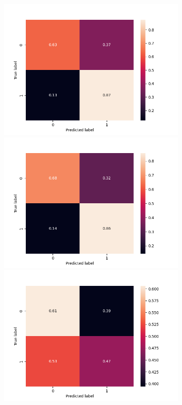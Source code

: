 \begin{figure}
\begin{subfigure}[b]{\textwidth}
      \includegraphics[width=\linewidth]{figures/results/word_embeddings/nn/calibrate/calibrate_set_4_confusion_matrix_percent.png}
    \endminipage\hfill
    \includegraphics[width=\linewidth]{figures/results/word_embeddings/nn/calibrate/calibrate_set_5_confusion_matrix_percent.png}
    \endminipage\hfill {}%
    \includegraphics[width=\linewidth]{figures/results/word_embeddings/nn/calibrate/calibrate_set_6_confusion_matrix_percent.png}

\end{subfigure}
\end{figure}
